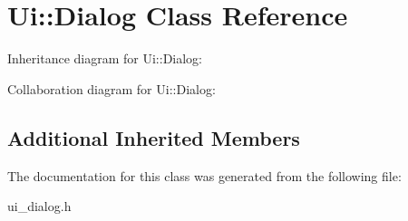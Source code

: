 \hypertarget{classUi_1_1Dialog}{}\section{Ui\+:\+:Dialog Class Reference}
\label{classUi_1_1Dialog}


Inheritance diagram for Ui\+:\+:Dialog\+:


Collaboration diagram for Ui\+:\+:Dialog\+:
\subsection*{Additional Inherited Members}


The documentation for this class was generated from the following file\+:\begin{DoxyCompactItemize}
\item 
ui\+\_\+dialog.\+h\end{DoxyCompactItemize}
